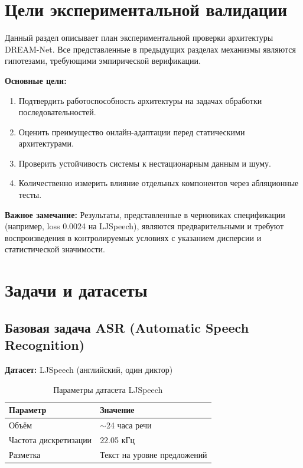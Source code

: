 \section{Цели экспериментальной валидации}

Данный раздел описывает план экспериментальной проверки архитектуры DREAM-Net. Все представленные в предыдущих разделах механизмы являются гипотезами, требующими эмпирической верификации.

\textbf{Основные цели:}
\begin{enumerate}
    \item Подтвердить работоспособность архитектуры на задачах обработки последовательностей.
    \item Оценить преимущество онлайн-адаптации перед статическими архитектурами.
    \item Проверить устойчивость системы к нестационарным данным и шуму.
    \item Количественно измерить влияние отдельных компонентов через абляционные тесты.
\end{enumerate}

\textbf{Важное замечание:} Результаты, представленные в черновиках спецификации (например, loss 0.0024 на LJSpeech), являются предварительными и требуют воспроизведения в контролируемых условиях с указанием дисперсии и статистической значимости.

\section{Задачи и датасеты}

\subsection{Базовая задача ASR (Automatic Speech Recognition)}

\textbf{Датасет:} LJSpeech (английский, один диктор)

\begin{table}[h]
\centering
\caption{Параметры датасета LJSpeech}
\label{tab:ljspeech}
\begin{tabular}{lp{8cm}}
\toprule
\textbf{Параметр} & \textbf{Значение} \\
\midrule
Объём & $\sim$24 часа речи \\
Частота дискретизации & 22.05 кГц \\
Разметка & Текст на уровне предложений \\
\bottomrule
\end{tabular}
\end{table}

